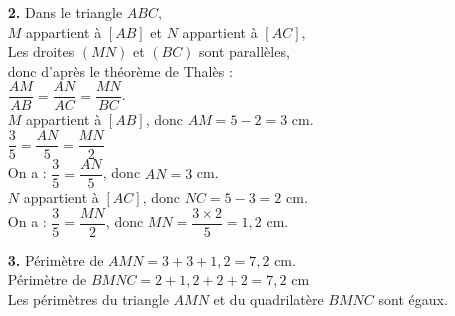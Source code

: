 \begin{minipage}{9.8cm}
\begin{enumerate}
\item[\textbf{2.}]
 Dans le triangle $ABC$, \\
$M$ appartient à $[AB]$ et $N$ appartient à $[AC]$, \\
Les droites $(MN)$ et $(BC)$ sont parallèles, \\
donc d'après le théorème de Thalès : \\[2mm]
$\dfrac{AM}{AB}=\dfrac{AN}{AC}=\dfrac{MN}{BC}$. \\[2mm]
$M$ appartient à $[AB]$, donc $AM=5-2=3$ cm. \\[2mm]
$\dfrac{3}{5}=\dfrac{AN}{5}=\dfrac{MN}{2}$ \\[2mm]
On a : $\dfrac{3}{5}=\dfrac{AN}{5}$, donc $AN=3$ cm. \\
$N$ appartient à $[AC]$, donc $NC=5-3=2$ cm.\\
On a : $\dfrac{3}{5}=\dfrac{MN}{2}$, donc $MN=\dfrac{3\times2}{5}=1,2$ cm.

\item[\textbf{3.}] 
Périmètre de $AMN=3+3+1,2=7,2$ cm. \\
Périmètre de $BMNC=2+1,2+2+2=7,2$ cm \\
Les périmètres du triangle $AMN$ et du \linebreak quadrilatère $BMNC$ sont égaux. 
\end{enumerate}
\end{minipage}	

\vspace{0.5cm}


